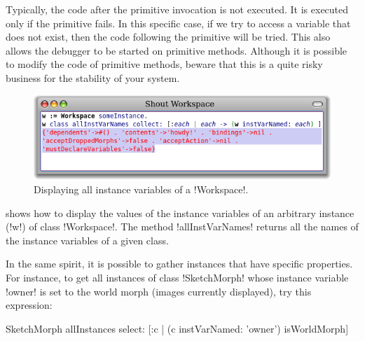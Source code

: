 \documentclass[a4paper,10pt,twoside]{book}
\begin{document}
Typically, the code after the primitive invocation is not executed.
It is executed only if the primitive fails. In this specific case, if we try to access a variable that does not exist, then the code following the primitive will be tried.
This also allows the debugger to be started on primitive methods.
Although it is possible to modify the code of primitive methods, beware that this is a quite risky business for the stability of your \pharo system.


\begin{figure}[ht]\centering
	\includegraphics[width=0.8\linewidth]{allInstanceVariables}
	\caption{Displaying all instance variables of a \ct!Workspace!.\label{fig:allInstanceVariables}}
\end{figure}

 shows how to display the values of the instance variables of an arbitrary instance (\ct!w!) of class \ct!Workspace!.
The method \ct!allInstVarNames! returns all the names of the instance variables of a given class.

In the same spirit, it is possible to gather instances that have specific properties.
For instance, to get all instances of class \ct!SketchMorph! whose instance variable \ct!owner! is set to the world morph (\ie images currently displayed), try this expression:
\begin{code}{}
SketchMorph allInstances select: [:c | (c instVarNamed: 'owner') isWorldMorph]
\end{code}
\end{document}

